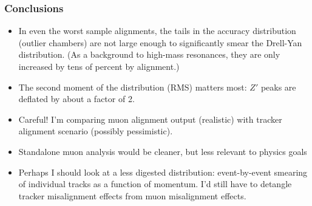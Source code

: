 \documentclass[compress]{beamer}
\begin{document}
\begin{frame}
\frametitle{Conclusions}
\begin{itemize}\setlength{\itemsep}{0.1cm}
\item In even the worst sample alignments, the tails in the accuracy
distribution (outlier chambers) are not large enough to significantly
smear the Drell-Yan distribution.  (As a background to high-mass
resonances, they are only increased by tens of percent by alignment.)

\item The second moment of the distribution (RMS) matters most: $Z'$
peaks are deflated by about a factor of 2.

\item Careful!  I'm comparing muon alignment output (realistic) with
tracker alignment scenario (possibly pessimistic).

\item Standalone muon analysis would be cleaner, but less relevant to
physics goals

\item Perhaps I should look at a less digested distribution:
event-by-event smearing of individual tracks as a function of
momentum.  I'd still have to detangle tracker misalignment effects
from muon misalignment effects.
\end{itemize}
\label{numpages}
\end{frame}
\end{document}
